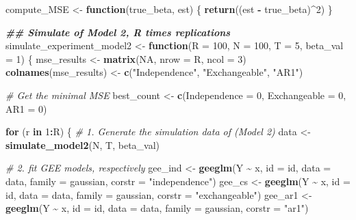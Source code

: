 \documentclass[
]{article}
\newenvironment{Shaded}{\begin{snugshade}}{\end{snugshade}}
\newcommand{\AttributeTok}[1]{\textcolor[rgb]{0.13,0.29,0.53}{#1}}
\newcommand{\CommentTok}[1]{\textcolor[rgb]{0.56,0.35,0.01}{\textit{#1}}}
\newcommand{\ConstantTok}[1]{\textcolor[rgb]{0.56,0.35,0.01}{#1}}
\newcommand{\ControlFlowTok}[1]{\textcolor[rgb]{0.13,0.29,0.53}{\textbf{#1}}}
\newcommand{\DecValTok}[1]{\textcolor[rgb]{0.00,0.00,0.81}{#1}}
\newcommand{\DocumentationTok}[1]{\textcolor[rgb]{0.56,0.35,0.01}{\textbf{\textit{#1}}}}
\newcommand{\FunctionTok}[1]{\textcolor[rgb]{0.13,0.29,0.53}{\textbf{#1}}}
\newcommand{\NormalTok}[1]{#1}
\newcommand{\OtherTok}[1]{\textcolor[rgb]{0.56,0.35,0.01}{#1}}
\newcommand{\SpecialCharTok}[1]{\textcolor[rgb]{0.81,0.36,0.00}{\textbf{#1}}}
\newcommand{\StringTok}[1]{\textcolor[rgb]{0.31,0.60,0.02}{#1}}
\begin{document}
\begin{Shaded}
\begin{Highlighting}[]
\NormalTok{compute\_MSE }\OtherTok{\textless{}{-}} \ControlFlowTok{function}\NormalTok{(true\_beta, est) \{}
  \FunctionTok{return}\NormalTok{((est }\SpecialCharTok{{-}}\NormalTok{ true\_beta)}\SpecialCharTok{\^{}}\DecValTok{2}\NormalTok{)}
\NormalTok{\}}

\DocumentationTok{\#\# Simulate of Model 2, R times replications}
\NormalTok{simulate\_experiment\_model2 }\OtherTok{\textless{}{-}} \ControlFlowTok{function}\NormalTok{(}\AttributeTok{R =} \DecValTok{100}\NormalTok{, }\AttributeTok{N =} \DecValTok{100}\NormalTok{, }\AttributeTok{T =} \DecValTok{5}\NormalTok{, }\AttributeTok{beta\_val =} \DecValTok{1}\NormalTok{) \{}
\NormalTok{  mse\_results }\OtherTok{\textless{}{-}} \FunctionTok{matrix}\NormalTok{(}\ConstantTok{NA}\NormalTok{, }\AttributeTok{nrow =}\NormalTok{ R, }\AttributeTok{ncol =} \DecValTok{3}\NormalTok{)}
  \FunctionTok{colnames}\NormalTok{(mse\_results) }\OtherTok{\textless{}{-}} \FunctionTok{c}\NormalTok{(}\StringTok{"Independence"}\NormalTok{, }\StringTok{"Exchangeable"}\NormalTok{, }\StringTok{"AR1"}\NormalTok{)}
  
  \CommentTok{\# Get the minimal MSE}
\NormalTok{  best\_count }\OtherTok{\textless{}{-}} \FunctionTok{c}\NormalTok{(}\AttributeTok{Independence =} \DecValTok{0}\NormalTok{, }\AttributeTok{Exchangeable =} \DecValTok{0}\NormalTok{, }\AttributeTok{AR1 =} \DecValTok{0}\NormalTok{)}
  
  \ControlFlowTok{for}\NormalTok{ (r }\ControlFlowTok{in} \DecValTok{1}\SpecialCharTok{:}\NormalTok{R) \{}
    \CommentTok{\# 1. Generate the simulation data of (Model 2)}
\NormalTok{    data }\OtherTok{\textless{}{-}} \FunctionTok{simulate\_model2}\NormalTok{(N, T, beta\_val)}
    
    \CommentTok{\# 2. fit GEE models, respectively}
\NormalTok{    gee\_ind }\OtherTok{\textless{}{-}} \FunctionTok{geeglm}\NormalTok{(Y }\SpecialCharTok{\textasciitilde{}}\NormalTok{ x, }\AttributeTok{id =}\NormalTok{ id, }\AttributeTok{data =}\NormalTok{ data, }\AttributeTok{family =}\NormalTok{ gaussian, }\AttributeTok{corstr =} \StringTok{"independence"}\NormalTok{)}
\NormalTok{    gee\_cs  }\OtherTok{\textless{}{-}} \FunctionTok{geeglm}\NormalTok{(Y }\SpecialCharTok{\textasciitilde{}}\NormalTok{ x, }\AttributeTok{id =}\NormalTok{ id, }\AttributeTok{data =}\NormalTok{ data, }\AttributeTok{family =}\NormalTok{ gaussian, }\AttributeTok{corstr =} \StringTok{"exchangeable"}\NormalTok{)}
\NormalTok{    gee\_ar1 }\OtherTok{\textless{}{-}} \FunctionTok{geeglm}\NormalTok{(Y }\SpecialCharTok{\textasciitilde{}}\NormalTok{ x, }\AttributeTok{id =}\NormalTok{ id, }\AttributeTok{data =}\NormalTok{ data, }\AttributeTok{family =}\NormalTok{ gaussian, }\AttributeTok{corstr =} \StringTok{"ar1"}\NormalTok{)}
    

\end{Highlighting}
\end{Shaded}
\end{document}
